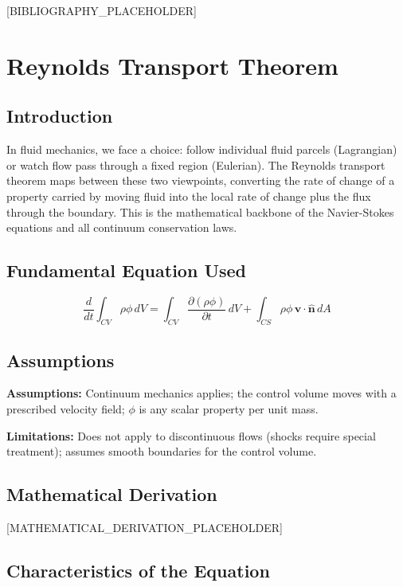 \documentclass[11pt,openright]{book}
\begin{document}
[BIBLIOGRAPHY_PLACEHOLDER]


\chapter{Reynolds Transport Theorem}

\section*{Introduction}

In fluid mechanics, we face a choice: follow individual fluid parcels (Lagrangian) or watch flow pass through a fixed region (Eulerian). The Reynolds transport theorem maps between these two viewpoints, converting the rate of change of a property carried by moving fluid into the local rate of change plus the flux through the boundary. This is the mathematical backbone of the Navier-Stokes equations and all continuum conservation laws.
\section*{Fundamental Equation Used}

\begin{equation}
\frac{d}{dt}\int_{CV} \rho\phi\, dV = \int_{CV} \frac{\partial(\rho\phi)}{\partial t}\, dV + \int_{CS} \rho\phi\,\mathbf{v}\cdot\hat{\mathbf{n}}\, dA
\end{equation}
\section*{Assumptions}

\textbf{Assumptions:} Continuum mechanics applies; the control volume moves with a prescribed velocity field; $\phi$ is any scalar property per unit mass.


\textbf{Limitations:} Does not apply to discontinuous flows (shocks require special treatment); assumes smooth boundaries for the control volume.


\section*{Mathematical Derivation}

[MATHEMATICAL_DERIVATION_PLACEHOLDER]

\section*{Characteristics of the Equation}
\end{document}
